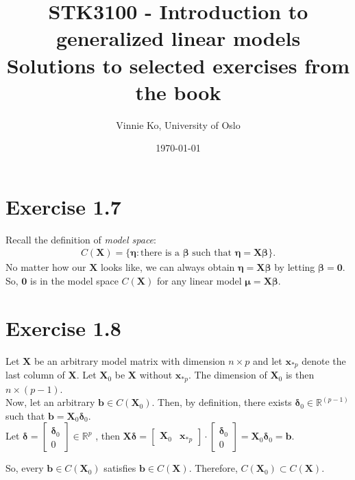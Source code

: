 \documentclass[a4paper]{article}
\title{STK3100 - Introduction to generalized linear models \\
Solutions to selected exercises from the book}
\author{Vinnie Ko, University of Oslo}
\date{\today}
\begin{document}
\everymath{\displaystyle}
\maketitle

\section{Exercise 1.7}
Recall the definition of \textit{model space}: 
\begin{align*}
C(\bm{X}) = \{\bm{\eta}: \mbox{there is a $\bm{\beta}$ such that $\bm{\eta} = \bm{X}\bm{\beta}$}\}.
\end{align*}
No matter how our $\bm{X}$ looks like, we can always obtain $\bm{\eta} = \bm{X}\bm{\beta}$ by letting $\bm{\beta} = \bm{0}$.
So, $\bm{0}$ is in the model space $C(\bm{X})$ for any linear model $\bm{\mu} = \bm{X}\bm{\beta}.$



\vspace{\baselineskip}
\section{Exercise 1.8}
Let $\bm{X}$ be an arbitrary model matrix with dimension $n \times p$ and let $\bm{x}_{*p}$ denote the last column of $\bm{X}$. Let $\bm{X}_{0}$ be $\bm{X}$ without $\bm{x}_{*p}$. The dimension of $\bm{X}_{0}$ is then $n \times (p - 1)$.\\
Now, let an arbitrary $\bm{b} \in C(\bm{X}_{0})$. Then, by definition, there exists $\bm{\delta}_{0} \in \mathbb{R}^{(p-1)}$ such that $\bm{b} = \bm{X}_{0} \bm{\delta}_{0}$.\\
Let $\bm{\delta} =
\begin{bmatrix}
\bm{\delta}_{0}\\
0
\end{bmatrix}
\in \mathbb{R}^{p}$
, then
$\bm{X}\bm{\delta} =
\begin{bmatrix}
\bm{X}_{0} & \bm{x}_{*p}
\end{bmatrix}
\cdot
\begin{bmatrix}
\bm{\delta}_{0}\\
0
\end{bmatrix}
= \bm{X}_{0} \bm{\delta}_{0}
= \bm{b}
$.

So, every $\bm{b} \in C(\bm{X}_{0})$ satisfies $\bm{b} \in C(\bm{X})$. Therefore, $C(\bm{X}_{0}) \subset C(\bm{X})$.


\vspace{\baselineskip}
\end{document}
